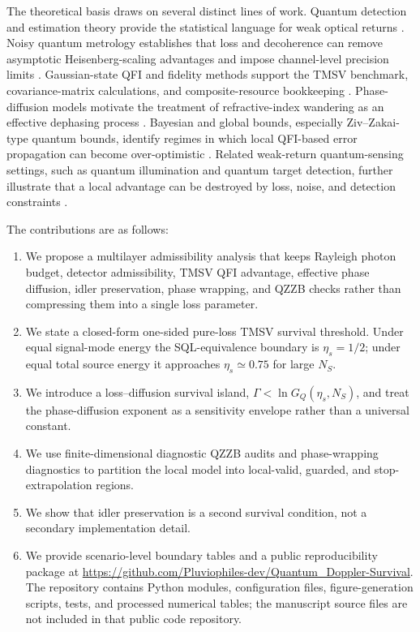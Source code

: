 \documentclass[a4paper,11pt]{article}
\numberwithin{equation}{section}
\newcommand{\Ns}{N_{S}}
\newcommand{\etas}{\eta_s}
\newcommand{\GQ}{G_Q}
\newcommand{\repoURL}{\url{https://github.com/Pluviophiles-dev/Quantum_Doppler-Survival}}
\begin{document}
The theoretical basis draws on several distinct lines of work. Quantum detection and estimation theory provide the statistical language for weak optical returns \cite{Helstrom1976,Holevo1982}. Noisy quantum metrology establishes that loss and decoherence can remove asymptotic Heisenberg-scaling advantages and impose channel-level precision limits \cite{Giovannetti2004,Giovannetti2011,Escher2011,Demkowicz2012,Demkowicz2015,Pezze2018}. Gaussian-state QFI and fidelity methods support the TMSV benchmark, covariance-matrix calculations, and composite-resource bookkeeping \cite{BraunsteinCaves1994,Paris2009,Monras2013,Safranek2019,Banchi2015,Weedbrook2012,Lu2012}. Phase-diffusion models motivate the treatment of refractive-index wandering as an effective dephasing process \cite{Genoni2011,Altorio2015,Pinel2013}. Bayesian and global bounds, especially Ziv--Zakai-type quantum bounds, identify regimes in which local QFI-based error propagation can become over-optimistic \cite{Tsang2012,Tsang2013}. Related weak-return quantum-sensing settings, such as quantum illumination and quantum target detection, further illustrate that a local advantage can be destroyed by loss, noise, and detection constraints \cite{Lloyd2008,Tan2008,Shapiro2020,Pirandola2018}.

The contributions are as follows:
\begin{enumerate}[label=(\roman*)]
  \item We propose a multilayer admissibility analysis that keeps Rayleigh photon budget, detector admissibility, TMSV QFI advantage, effective phase diffusion, idler preservation, phase wrapping, and QZZB checks rather than compressing them into a single loss parameter.
  \item We state a closed-form one-sided pure-loss TMSV survival threshold. Under equal signal-mode energy the SQL-equivalence boundary is $\etas=1/2$; under equal total source energy it approaches $\etas\simeq 0.75$ for large $\Ns$.
  \item We introduce a loss--diffusion survival island, $\Gamma < \ln \GQ(\etas,\Ns)$, and treat the phase-diffusion exponent as a sensitivity envelope rather than a universal constant.
  \item We use finite-dimensional diagnostic QZZB audits and phase-wrapping diagnostics to partition the local model into local-valid, guarded, and stop-extrapolation regions.
  \item We show that idler preservation is a second survival condition, not a secondary implementation detail.
  \item We provide scenario-level boundary tables and a public reproducibility package at \repoURL. The repository contains Python modules, configuration files, figure-generation scripts, tests, and processed numerical tables; the manuscript source files are not included in that public code repository.
\end{enumerate}
\end{document}
